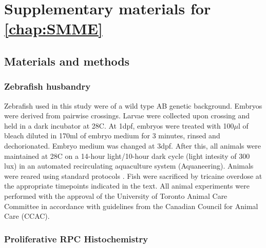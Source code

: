 \chapter{Supplementary materials for \autoref{chap:SMME}}
\label{chap:SMMsupp}
\section{Materials and methods}
\subsection{Zebrafish husbandry}
\label{ssec:husbandry}
Zebrafish used in this study were of a wild type AB genetic background. Embryos were derived from pairwise crossings. Larvae were collected upon crossing and held in a dark incubator at 28\textdegree C. At 1dpf, embryos were treated with 100$\mu$l of bleach diluted in 170ml of embryo medium for 3 minutes, rinsed and dechorionated. Embryo medium was changed at 3dpf. After this, all animals were maintained at 28\textdegree C on a 14-hour light/10-hour dark cycle (light intesity of 300 lux) in an automated recirculating aquaculture system (Aquaneering). Animals were reared using standard protocols \cite{Westerfield2000}. Fish were sacrificed by tricaine overdose at the appropriate timepoints indicated in the text. All animal experiments were performed with the approval of the University of Toronto Animal Care Committee in accordance with guidelines from the Canadian Council for Animal Care (CCAC).
 
\subsection{Proliferative RPC Histochemistry}
